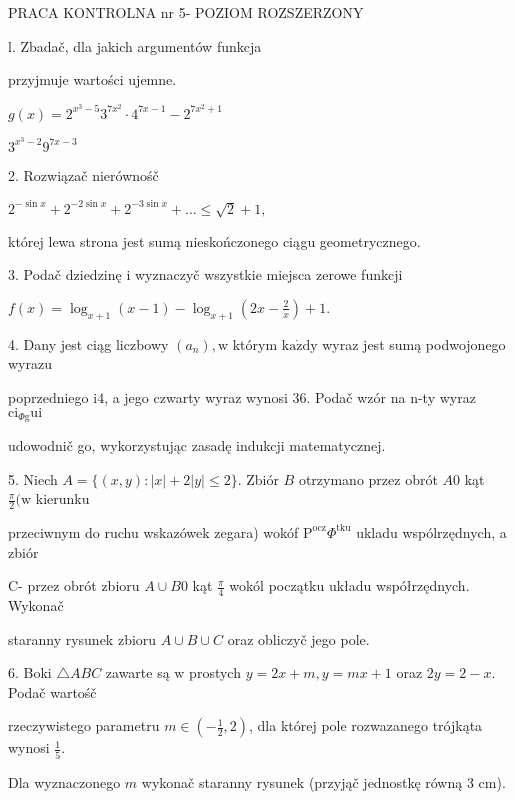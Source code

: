 \documentclass[a4paper,12pt]{article}
\begin{document}
PRACA KONTROLNA nr 5- POZIOM ROZSZERZONY

l. Zbadač, dla jakich argumentów funkcja

przyjmuje wartości ujemne.

$g(x)=2^{x^{3}-5} 3^{7x^{2}}\cdot 4^{7x-1}-2^{7x^{2}+1}$

$3^{x^{3}-2} 9^{7x-3}$

2. Rozwiązač nierównośč

$2^{-\sin x}+2^{-2\sin x}+2^{-3\sin x}+\ldots\leq\sqrt{2}+1,$

której lewa strona jest sumą nieskończonego ciągu geometrycznego.

3. Podač dziedzinę i wyznaczyč wszystkie miejsca zerowe funkcji

$f(x)=\displaystyle \log_{x+1}(x-1)-\log_{x+1}(2x-\frac{2}{x})+1.$

4. Dany jest ciąg liczbowy $(a_{n}), \mathrm{w}$ którym $\mathrm{k}\mathrm{a}\dot{\mathrm{z}}\mathrm{d}\mathrm{y}$ wyraz jest sumą podwojonego wyrazu

poprzedniego $\mathrm{i}4$, a jego czwarty wyraz wynosi 36. Podač wzór na n-ty wyraz $\mathrm{c}\mathrm{i}_{\Phi \mathrm{g}}\mathrm{u}\mathrm{i}$

udowodnič go, wykorzystując zasadę indukcji matematycznej.

5. Niech $A=\{(x,y):|x|+2|y|\leq 2\}$. Zbiór $B$ otrzymano przez obrót $A0$ kąt $\displaystyle \frac{\pi}{2}(\mathrm{w}$ kierunku

przeciwnym do ruchu wskazówek zegara) wokóf $\mathrm{P}^{\mathrm{o}\mathrm{c}\mathrm{z}}\Phi^{\mathrm{t}\mathrm{k}\mathrm{u}}$ ukladu wspólrzędnych, a zbiór

C- przez obrót zbioru $A\cup B0$ kąt $\displaystyle \frac{\pi}{4}$ wokól początku układu współrzędnych. Wykonač

staranny rysunek zbioru $A\cup B\cup C$ oraz obliczyč jego pole.

6. Boki $\triangle ABC$ zawarte są $\mathrm{w}$ prostych $y=2x+m, y=mx+1$ oraz $2y=2-x$. Podač wartośč

rzeczywistego parametru $m\displaystyle \in(-\frac{1}{2},2)$, dla której pole rozwazanego trójkąta wynosi $\displaystyle \frac{1}{5}.$

Dla wyznaczonego $m$ wykonač staranny rysunek (przyjąč jednostkę równą 3 cm).
\end{document}

